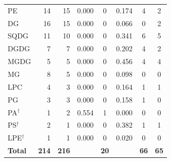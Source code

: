 \documentclass[9pt,twocolumn,twoside]{rilabRxiv}
\begin{document}
\begin{table}[!ht]
\begin{tabular}{lrrccccc}
PE & 14 & 15 & 0.000 & 0 & 0.174 & 4 & 2 \\
DG & 16 & 15 & 0.000 & 0 & 0.066 & 0 & 2 \\
SQDG & 11 & 10 & 0.000 & 0 & 0.341 & 6 & 5 \\
DGDG & 7 & 7 & 0.000 & 0 & 0.202 & 4 & 2 \\
MGDG & 5 & 5 & 0.000 & 0 & 0.456 & 4 & 4 \\
MG & 8 & 5 & 0.000 & 0 & 0.098 & 0 & 0 \\
LPC & 4 & 3 & 0.000 & 0 & 0.164 & 1 & 1 \\
PG & 3 & 3 & 0.000 & 0 & 0.158 & 1 & 0 \\
PA$^{\dagger}$ & 1 & 2 & 0.554 & 1 & 0.000 & 0 & 0 \\
PS$^{\dagger}$ & 2 & 1 & 0.000 & 0 & 0.382 & 1 & 1 \\
LPE$^{\dagger}$ & 1 & 1 & 0.000 & 0 & 0.020 & 0 & 0 \\
\midrule
\textbf{Total} & \textbf{214} & \textbf{216} & & \textbf{20} & & \textbf{66} & \textbf{65} \\
\bottomrule
\end{tabular}
\end{table}
\end{document}
